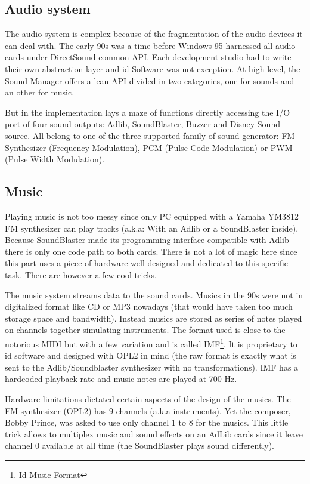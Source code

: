 \subsection{Audio system}
The audio system is complex because of the fragmentation of the audio devices it can deal with. The early 90s was a time before Windows 95 harnessed all audio cards under DirectSound common API. Each development studio had to write their own abstraction layer and id Software was not exception. At high level, the Sound Manager offers a lean API divided in two categories, one for sounds and an other for music.\\
\par
\begin{minipage}{\textwidth}

\end{minipage}
\par
But in the implementation lays a maze of functions directly accessing the I/O port of four sound outputs: Adlib, SoundBlaster, Buzzer and Disney Sound source. All belong to one of the three supported family of sound generator: FM Synthesizer (Frequency Modulation), PCM (Pulse Code Modulation) or PWM (Pulse Width Modulation).\\


\subsection{Music}
Playing music is not too messy since only PC equipped with a Yamaha YM3812 FM synthesizer can play tracks (a.k.a: With an Adlib or a SoundBlaster inside). Because SoundBlaster made its programming interface compatible with Adlib there is only one code path to both cards. There is not a lot of magic here since this part uses a piece of hardware well designed and dedicated to this specific task. There are however a few cool tricks.\\
\par
The music system streams data to the sound cards.  Musics in the 90s were not in digitalized format like CD or MP3 nowadays (that would have taken too much storage space and bandwidth). Instead musics are stored as series of notes played on channels together simulating instruments. The format used is close to the notorious MIDI but with a few variation and is called IMF\footnote{Id Music Format}. It is proprietary to id software and designed with OPL2 in mind (the raw format is exactly what is sent to the Adlib/Soundblaster synthesizer with no transformations). IMF has a hardcoded playback rate and music notes are played at 700 Hz.\\
\par
Hardware limitations dictated certain aspects of the design of the musics. The FM synthesizer (OPL2) has 9 channels (a.k.a instruments). Yet the composer, Bobby Prince, was asked to use only channel 1 to 8 for the musics. This little trick allows to multiplex music and sound effects on an AdLib cards since it leave channel 0 available at all time (the SoundBlaster plays sound differently).\\




